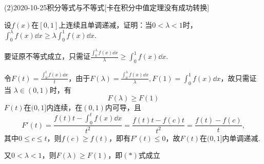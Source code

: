 \documentclass{ctexart}
\begin{document}
\begin{mathques}(2){2020-10-25}{积分等式与不等式}[卡在积分中值定理没有成功转换]
\begin{ques}
  设$f(x)$在$[0, 1]$上连续且单调递减，证明：当$0 < \lambda < 1$时，$\int_{0}
  ^{\lambda}f(x)\dd x \ge \lambda \int_{0}^{1}f(x)\dd x.$
\end{ques}
\begin{solu}
  要证原不等式成立，只需证$\frac{\int_{0}^{\lambda}f(x)\dd x}{\lambda} \ge
  \int_{0}^{1}f(x)\dd x$.

  令$F(t) = \frac{\int_{0}^{t}f(x)\dd x}{t}$，由于$F(\lambda) = \frac{\int_{0}
  ^{\lambda}f(x)\dd x}{\lambda}, F(1) = \int_{0}^{1}f(x)\dd x$，故只需证当
  $\lambda \in (0, 1)$时，有
  \begin{equation}
    F(\lambda) \ge F(1) \tag{$*$}
  \end{equation}
  $F(t)$在$(0, 1]$内连续，在$(0, 1)$内可导，且
  \[
    F'(t) = \frac{f(t)t - \int_{0}^{t}f(x)\dd x}{t^2} = \frac{f(t)t - f(c)t}
    {t^2} = \frac{f(t) - f(c)}{t},
  \]
  其中$0 \le c \le t$，则$f(c) \ge f(t)$，即有$F'(t) \le 0$，故$F(t)$在$(0, 1]
  $内单调递减.

  又$0 < \lambda < 1$，则$F(\lambda) \ge F(1)$，即$(*)$式成立
\end{solu}
\end{mathques}
\end{document}

